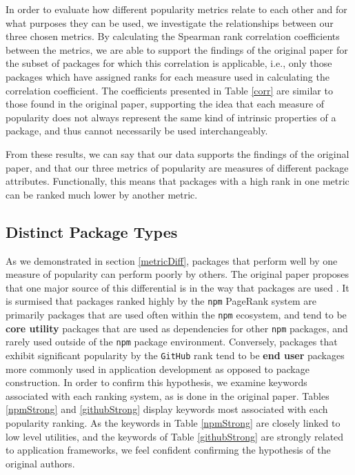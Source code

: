 \documentclass[10pt,conference]{IEEEtran}
\def\code#1{\texttt{#1}}
\begin{document}
In order to evaluate how different popularity metrics
relate to each other and for what purposes they can be used,
we investigate the relationships between our three chosen metrics.
By calculating the Spearman rank correlation coefficients between
the metrics, we are able to support the findings of the original 
paper for the subset of packages for which this correlation is applicable,
i.e., only those packages which have assigned ranks for each measure used
in calculating the correlation coefficient. The coefficients presented 
in Table \ref{corr} are similar to those found in the original paper, 
supporting the idea that each measure of popularity does not always
represent the same kind of intrinsic properties of a package, and
thus cannot necessarily be used interchangeably.


From these results, we can say that our data supports the findings of the original paper, and
that our three metrics of popularity
are measures of different package attributes. Functionally, this means that packages
with a high rank in one metric can be ranked much lower by another metric.

\subsection{Distinct Package Types}

As we demonstrated in section \ref{metricDiff}, packages that perform well
by one measure of popularity can perform poorly by others. The original paper
proposes that one major source of this differential is in the way that packages
are used \cite{Wittern:2016}. It is surmised that packages ranked highly by the
\code{npm} PageRank system are primarily packages that are used often within the
\code{npm} ecosystem, and tend to be \textbf{core utility} packages that are used
as dependencies for other \code{npm} packages, and rarely used outside of the
\code{npm} package environment. Conversely, packages that exhibit
significant popularity by the \code{GitHub} rank tend to be \textbf{end user} packages more
commonly used in application development as opposed to package construction. 
In order to confirm this hypothesis, we examine keywords associated with each
ranking system, as is done in the original paper.
Tables \ref{npmStrong} and \ref{githubStrong} display keywords most associated with
each popularity ranking. As the keywords in Table \ref{npmStrong} are closely linked to 
low level utilities, and the keywords of Table \ref{githubStrong} are strongly related to
application frameworks, we feel confident confirming the hypothesis of the original authors.
\end{document}
